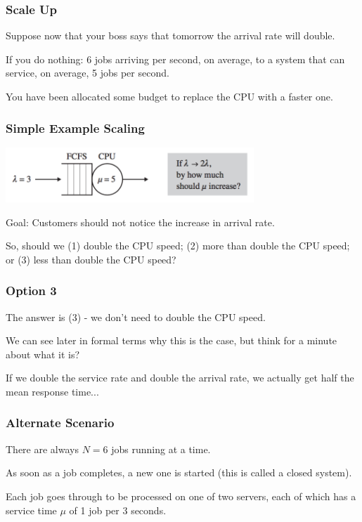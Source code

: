 \begin{frame}
\frametitle{Scale Up}

Suppose now that your boss says that tomorrow the arrival rate will double.

If you do nothing: 6 jobs arriving per second, on average, to a system that can service, on average, 5 jobs per second. 

You have been allocated some budget to replace the CPU with a faster one.

\end{frame}



\begin{frame}
\frametitle{Simple Example Scaling}

\begin{center}
	\includegraphics[width=0.7\textwidth]{images/qt-example1.png}
\end{center}

Goal: Customers should not notice the increase in arrival rate. 

So, should we (1) double the CPU speed; (2) more than double the CPU speed; or (3) less than double the CPU speed?

\end{frame}



\begin{frame}
\frametitle{Option 3}


The answer is (3) - we don't need to double the CPU speed. 

We can see later in formal terms why this is the case, but think for a minute about what it is? 

If we double the service rate and double the arrival rate, we actually get half the mean response time...


\end{frame}



\begin{frame}
\frametitle{Alternate Scenario}

There are always $N=6$ jobs running at a time. 

As soon as a job completes, a new one is started (this is called a \alert{closed system}). 

Each job goes through to be processed on one of two servers, each of which has a service time $\mu$ of 1 job per 3 seconds.

\end{frame}



